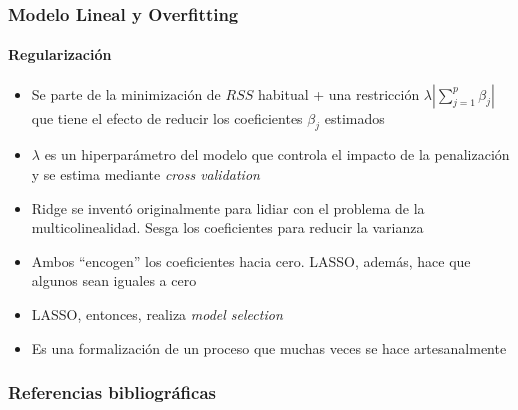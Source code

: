 \documentclass{beamer}
\begin{document}
\begin{frame}
	\frametitle{Modelo Lineal y Overfitting}
	\framesubtitle{Regularización}
	\begin{itemize}
		\item{Se parte de la minimización de $RSS$ habitual + una restricción $\lambda|\sum_{j=1}^p\beta_{j}|$ que tiene el efecto de reducir los coeficientes $\beta_{j}$ estimados}
		\item{$\lambda$ es un hiperparámetro del modelo que controla el impacto de la penalización y se estima mediante \emph{cross validation}}
		\item{Ridge se inventó originalmente para lidiar con el problema de la multicolinealidad. Sesga los coeficientes para reducir la varianza}
		\item{Ambos ``encogen'' los coeficientes hacia cero. LASSO, además, hace que algunos sean iguales a cero}
		\item{LASSO, entonces, realiza \emph{model selection}}
		\item{Es una formalización de un proceso que muchas veces se hace artesanalmente}
	\end{itemize}
\end{frame}


\begin{frame}[allowframebreaks] %

	\frametitle{Referencias bibliográficas}
		\scriptsize{}
\end{frame}
\end{document}
